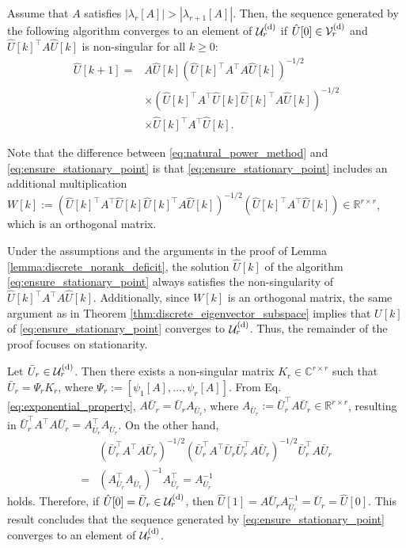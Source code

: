\documentclass{ifacconf}
\begin{document}
\begin{prop}\label{prop:ensure_stationary_point}
Assume that $A$ satisfies $| \lambda _{r}[A] | > | \lambda _{r+1}[A] |$. Then, the sequence generated by the following algorithm converges to an element of $\mathcal{U}_{r}^{\rm (d)}$ if $\hat{U}[0] \in \mathcal{V}_{r} ^{\rm (d)}$ and $\hat{U}[k]^{\top}A \hat{U}[k]$ is non-singular for all $k\geq 0$:
\begin{align}
    \hat{U}[k+1] =& A \hat{U}[k] (\hat{U}[k]^{\top} A^{\top} A \hat{U}[k]) ^{-1/2} 
    \nonumber \\
    & \times (\hat{U}[k]^{\top} A^{\top} \hat{U}[k] \hat{U}[k]^{\top} A \hat{U}[k]) ^{-1/2} 
    \nonumber \\ & \times
    \hat{U}[k]^{\top} A^{\top} \hat{U}[k].
    \label{eq:ensure_stationary_point}
\end{align}
\end{prop}

\begin{pf}
Note that the difference between \eqref{eq:natural_power_method} and \eqref{eq:ensure_stationary_point} is that \eqref{eq:ensure_stationary_point} includes an additional multiplication $W[k] := (\hat{U}[k]^{\top} A^{\top} \hat{U}[k] \hat{U}[k]^{\top} A \hat{U}[k]) ^{-1/2} (\hat{U}[k]^{\top} A^{\top} \hat{U}[k]) \in \mathbb{R}^{r\times r}$, which is an orthogonal matrix.

Under the assumptions and the arguments in the proof of Lemma \ref{lemma:discrete_norank_deficit}, the solution $\hat{U}[k]$ of the algorithm \eqref{eq:ensure_stationary_point} always satisfies the non-singularity of $\hat{U}[k]^{\top} A^{\top} A \hat{U}[k]$.  
Additionally, since $W[k]$ is an orthogonal matrix, the same argument as in Theorem \ref{thm:discrete_eigenvector_subspace} implies that $U[k]$ of \eqref{eq:ensure_stationary_point} converges to $\mathcal{U}_{r}^{\rm (d)}$. 
Thus, the remainder of the proof focuses on stationarity. 

Let $\bar{U}_{r} \in \mathcal{U}_{r}^{\rm (d)}$. Then there exists a non-singular matrix $K_{r} \in \mathbb{C}^{r\times r}$ such that $\bar{U}_{r} = \Psi _{r} K_{r}$, where $\Psi _{r} := [\psi _{1}[A] ,\dots ,\psi _{r}[A]]$.  
From Eq. \eqref{eq:exponential_property}, $A \bar{U} _{r} = \bar{U}_{r} A_{\bar{U}_{r}}$, where $A_{\bar{U}_{r}} := \bar{U}_{r}^{\top}A\bar{U}_{r} \in \mathbb{R}^{r\times r}$, resulting in $\bar{U}_{r}^{\top} A^{\top} A \bar{U}_{r} = A_{\bar{U}_{r}}^{\top} A_{\bar{U}_{r}}$. 
On the other hand,
\begin{align*}
    &(\bar{U}_{r}^{\top} A^{\top} A \bar{U}_{r} ) ^{-1/2} 
    (\bar{U}_{r}^{\top} A^{\top} \bar{U}_{r} \bar{U}_{r}^{\top} A \bar{U}_{r} ) ^{-1/2} 
    \bar{U}_{r}^{\top} A \bar{U}_{r}
    \\
    =&
    (A_{\bar{U}_{r}}^{\top} A_{\bar{U}_{r}}) ^{-1} A_{\bar{U}_{r}}^{\top} = A_{\bar{U}_{r}}^{-1}
\end{align*}
holds. 
Therefore, if $\hat{U}[0] = \bar{U}_{r}  \in \mathcal{U}_{r}^{\rm (d)}$, then
    $\hat{U}[1] = A\bar{U}_{r} A_{\bar{U}_{r}}^{-1} = \bar{U}_{r} = \hat{U}[0]$.
This result concludes that the sequence generated by \eqref{eq:ensure_stationary_point} converges to an element of $\mathcal{U}_{r}^{\rm (d)}$.  
\end{pf}
\end{document}
